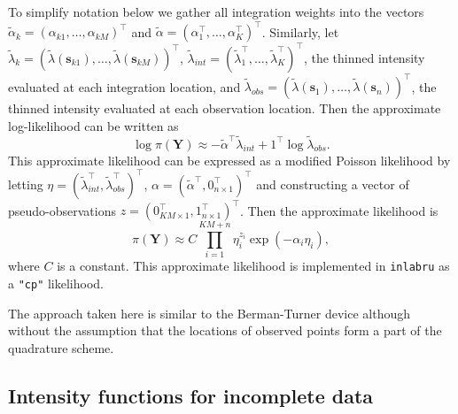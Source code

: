 \documentclass{stylefile16/statsoc}
\newcommand{\bs}{\mathbf{s}}
\newcommand{\bm}{\boldsymbol}  %
\newcommand{\tl}{\tilde{\lambda}}   %
\begin{document}
To simplify notation below we gather all integration weights into the vectors $\tilde{\alpha}_{k} = (\alpha_{k1}, \ldots, \alpha_{kM})^\intercal$ and $\tilde{\alpha} = (\alpha_1^\intercal, \ldots, \alpha_K^\intercal)^\intercal$.  Similarly, let $\tl_k = (\tl(\bs_{k1}), \ldots, \tl(\bs_{kM}))^\intercal$, $\tl_{int} = (\tl_1^\intercal, \ldots, \tl_K^\intercal)^\intercal$, the thinned intensity evaluated at each integration location, and $\tl_{obs} = (\tl(\bs_1), \ldots, \tl(\bs_n))^\intercal$, the thinned intensity evaluated at each observation location.  Then the approximate log-likelihood can be written as
\begin{equation}
\label{approx-log-likelihood}
	\log \pi(\bm{Y}) \approx - \tilde{\alpha}^\intercal \tl_{int} + 1^\intercal\log\tl_{obs}.
\end{equation}
This approximate likelihood can be expressed as a modified Poisson likelihood by letting $\eta = (\tl_{int}^\intercal, \tl_{obs}^\intercal)^\intercal$,
$\alpha = (\tilde{\alpha}^\intercal, 0_{n \times 1}^\intercal)^\intercal$ and constructing a vector of pseudo-observations $z = (0_{KM\times 1}^\intercal, 1_{n \times 1}^\intercal)^\intercal$.  Then the approximate likelihood is
\begin{equation}
\pi(\bm{Y}) \approx C \prod\limits_{i=1}^{KM + n} \eta_i^{z_i}\exp(-\alpha_i\eta_i),
\end{equation}
where $C$ is a constant.  This approximate likelihood is implemented in \texttt{inlabru} as a \texttt{"cp"} likelihood.  

The approach taken here is similar to the Berman-Turner device \citep{berman_approximating_1992, baddeley_practical_2000} although without the assumption that the locations of observed points form a part of the quadrature scheme.

\subsection{Intensity functions for incomplete data}
\end{document}
